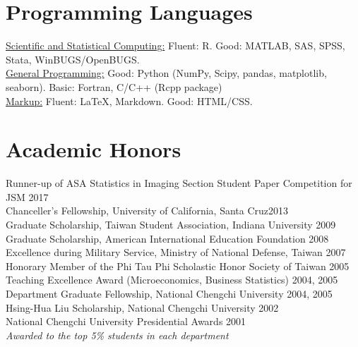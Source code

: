 \documentclass[]{res}
\begin{document}
\begin{resume}
\section{Programming Languages}
	\underline{Scientific and Statistical Computing:} Fluent: R. Good: MATLAB, SAS, SPSS, Stata, WinBUGS/OpenBUGS.\\
    \underline{General Programming:} Good: Python (NumPy, Scipy, pandas, matplotlib, seaborn). Basic: Fortran, C/C++ (Rcpp package)\\
    \underline{Markup:} Fluent: {\LaTeX}, Markdown. Good: HTML/CSS. \\
    
	
 
\section{Academic Honors}
Runner-up of ASA Statistics in Imaging Section Student Paper Competition for JSM \hfill 2017\\
Chanceller's Fellowship, University of California, Santa Cruz\hfill 2013\\
Graduate Scholarship, Taiwan Student Association, Indiana University \hfill 2009\\
Graduate Scholarship, American International Education Foundation  \hfill 2008\\
Excellence during Military Service, Ministry of National Defense, Taiwan \hfill 2007\\
Honorary Member of the Phi Tau Phi Scholastic Honor Society of Taiwan \hfill 2005\\
Teaching Excellence Award (Microeconomics, Business Statistics) \hfill 2004, 2005\\
Department Graduate Fellowship, National Chengchi University \hfill 2004, 2005\\
Hsing-Hua Liu Scholarship, National Chengchi University \hfill 2002\\
National Chengchi University Presidential Awards \hfill 2001\\
\textit{Awarded to the top 5\% students in each department}



\end{resume}
\end{document}
